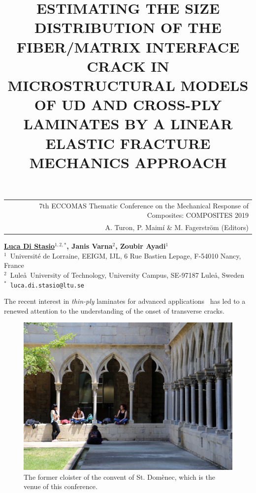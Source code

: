 \documentclass[12pt,a4paper]{article}
\begin{document}
\thispagestyle{empty}

\vspace*{-3.4cm}
\begin{table}[!h]
\begin{tabular}{r}
\hspace*{2.9cm} \scriptsize \textsf{7th ECCOMAS Thematic Conference on the Mechanical Response of Composites: COMPOSITES 2019} \\
\hspace*{2.9cm} \tiny \textsf{A. Turon, P. Maimí \& M. Fagerström (Editors)}
\end{tabular}
\end{table}

\vspace*{-0.7cm}

\begin{center}
\title{ESTIMATING THE SIZE DISTRIBUTION OF THE FIBER/MATRIX INTERFACE CRACK IN MICROSTRUCTURAL MODELS OF UD AND CROSS-PLY LAMINATES BY A LINEAR ELASTIC FRACTURE MECHANICS APPROACH}
\end{center}
\begin{center}
\textbf{\underline{Luca Di Stasio}$^{1,2,*}$, Janis Varna$^{2}$, Zoubir Ayadi$^{1}$} \\ [7pt]
\small{$^1$~Universit\'e de Lorraine, EEIGM, IJL, 6 Rue Bastien Lepage, F-54010 Nancy, France}  \\  [2pt]
\small{$^2$~Lule\aa\ University of Technology, University Campus, SE-97187 Lule\aa, Sweden}  \\  [2pt]
\small{$^*$~\texttt{luca.di.stasio@ltu.se}} \\
\end{center}

\noindent
The recent interest in \emph{thin-ply} laminates for advanced applications~\cite{} has led to a renewed attention to the understanding of the onset of transverse cracks.

\begin{figure}[h]
\centering\includegraphics[width=0.55\linewidth]{Claustre.pdf}
\caption{The former cloister of the convent of St. Domènec, which is the venue of this conference.}
\label{fig:Claustre}
\end{figure}
\end{document}
